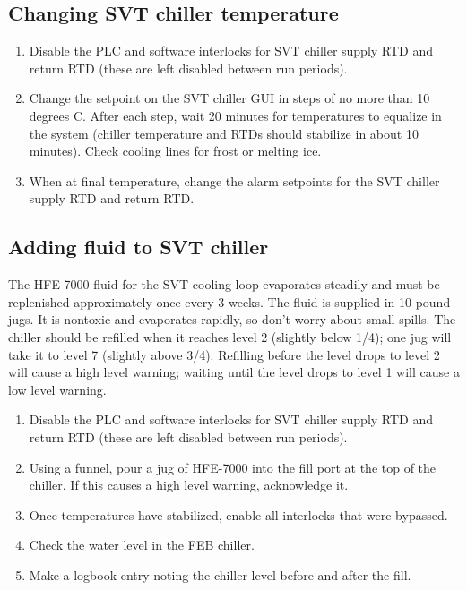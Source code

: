 \subsection{Changing SVT chiller temperature}
\label{sec:proc_svt_chiller_tempchange}
\begin{enumerate}
    \item Disable the PLC and software interlocks for SVT chiller supply RTD and return RTD (these are left disabled between run periods).
    \item Change the setpoint on the SVT chiller GUI in steps of no more than 10 degrees C.
        After each step, wait 20 minutes for temperatures to equalize in the system (chiller temperature and RTDs should stabilize in about 10 minutes).
        Check cooling lines for frost or melting ice.
    \item When at final temperature, change the alarm setpoints for the SVT chiller supply RTD and return RTD.
\end{enumerate}

\subsection{Adding fluid to SVT chiller}
\label{sec:proc_svt_chiller_refill}
The HFE-7000 fluid for the SVT cooling loop evaporates steadily and must be replenished approximately once every 3 weeks.
The fluid is supplied in 10-pound jugs. It is nontoxic and evaporates rapidly, so don't worry about small spills.
The chiller should be refilled when it reaches level 2 (slightly below 1/4); one jug will take it to level 7 (slightly above 3/4).
Refilling before the level drops to level 2 will cause a high level warning; waiting until the level drops to level 1 will cause a low level warning.

\begin{enumerate}
    \item Disable the PLC and software interlocks for SVT chiller supply RTD and return RTD (these are left disabled between run periods).
    \item Using a funnel, pour a jug of HFE-7000 into the fill port at the top of the chiller. If this causes a high level warning, acknowledge it.
    \item Once temperatures have stabilized, enable all interlocks that were bypassed.
    \item Check the water level in the FEB chiller.
    \item Make a logbook entry noting the chiller level before and after the fill.
\end{enumerate}

